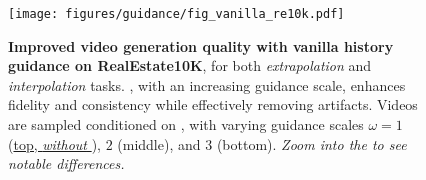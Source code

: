 
\begin{figure}[t]
    \centering
    \texttt{[image: figures/guidance/fig\_vanilla\_re10k.pdf]}
    \vskip -0.05in
    \caption{
        \textbf{Improved video generation quality with vanilla history guidance on RealEstate10K}, for both \emph{extrapolation} and \emph{interpolation} tasks. \HGv, with an increasing guidance scale, enhances fidelity and consistency while effectively removing artifacts. Videos are sampled conditioned on \textcolor{xred}{\setlength{\fboxsep}{1pt}\setlength{\fboxrule}{1pt}\textcolor{xred}{\fbox{\textcolor{black}{two history frames}}}}, with varying guidance scales $\omega = 1$ (\ul{top, \emph{without \HGv}}), $2$ (middle), and $3$ (bottom). \emph{Zoom into the \textcolor{xcyan}{\setlength{\fboxsep}{1pt}\setlength{\fboxrule}{1pt}\textcolor{xcyan}{\fbox{\textcolor{black}{boxed regions}}}} to see notable differences.}
    }
    \label{fig:vanilla_re10k}
\end{figure}
